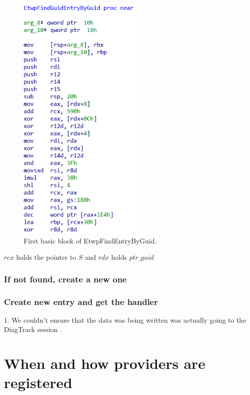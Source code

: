 \begin{centering}
\begin{figure}[H]
  \includegraphics[width=6cm]{images/etwpfindentrybyguid1.png}
  \caption[]{First basic block of EtwpFindEntryByGuid.}
  \label{fig:etwsilodriverstate_structure}
\end{figure}
\end{centering}

$rcx$ holds the pointer to $S$ and $rdx$ holds $ptr\_guid$













\subsubsection{If not found, create a new one}
\subsubsection{Create new entry and get the handler }

\newpage
{\huge 1. We couldn't ensure that the data was being written was actually going to the DiagTrack session .}

\section{When and how providers are registered}
